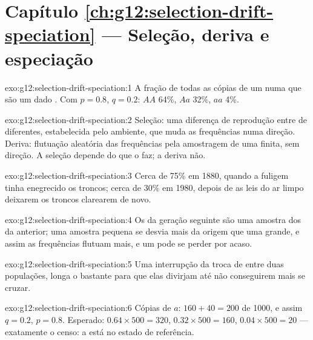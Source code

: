 \section*{Capítulo \ref{ch:g12:selection-drift-speciation} --- Seleção, deriva e especiação}

\begin{solution}{exo:g12:selection-drift-speciation:1}
A fração de todas as cópias de um  numa  que são um dado
. Com $p = 0.8$, $q = 0.2$: $AA$ 64\%, $Aa$ 32\%, $aa$ 4\%.
\end{solution}

\begin{solution}{exo:g12:selection-drift-speciation:2}
Seleção: uma diferença de reprodução entre  de 
diferentes, estabelecida pelo ambiente, que muda as frequências numa
direção. Deriva: flutuação aleatória das frequências pela amostragem de
uma  finita, sem direção. A seleção depende do que o 
faz; a deriva não.
\end{solution}

\begin{solution}{exo:g12:selection-drift-speciation:3}
Cerca de 75\% em 1880, quando a fuligem tinha enegrecido os troncos;
cerca de 30\% em 1980, depois de as leis do ar limpo deixarem os
troncos clarearem de novo.
\end{solution}

\begin{solution}{exo:g12:selection-drift-speciation:4}
Os  da geração seguinte são uma amostra dos da anterior; uma
amostra pequena se desvia mais da origem que uma grande, e assim as
frequências flutuam mais, e um  pode se perder por acaso.
\end{solution}

\begin{solution}{exo:g12:selection-drift-speciation:5}
Uma interrupção da troca de  entre duas populações, longa o
bastante para que elas divirjam até não conseguirem mais se cruzar.
\end{solution}

\begin{solution}{exo:g12:selection-drift-speciation:6}
Cópias de $a$: $160 + 40 = 200$ de 1000, e assim $q = 0.2$, $p = 0.8$.
Esperado: $0.64 \times 500 = 320$, $0.32 \times 500 = 160$, $0.04
\times 500 = 20$ --- exatamente o censo: a  está no estado de
referência.
\end{solution}

